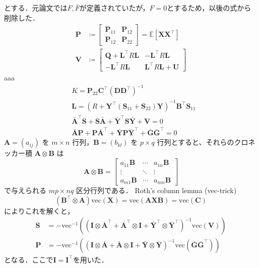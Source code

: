 とする．元論文では$F, \bar{F}$が定義されていたが，$F=0$とするため，以後の式から削除した．
\begin{align}
\mathbf{P} &\coloneqq\begin{bmatrix}
\mathbf{P}_{11} & \mathbf{P}_{12} \\
\mathbf{P}_{12} & \mathbf{P}_{22}
\end{bmatrix} = \mathbb{E}\left[\mathbf{X} \mathbf{X}^\top\right] \\
\mathbf{V} &\coloneqq\begin{bmatrix}
\mathbf{Q}+\mathbf{L}^\top R \mathbf{L} & -\mathbf{L}^\top R \mathbf{L} \\
-\mathbf{L}^\top R \mathbf{L} & \mathbf{L}^\top R \mathbf{L}+\mathbf{U}
\end{bmatrix}
\end{align}
aaa
\begin{align}
&K=\mathbf{P}_{22} \mathbf{C}^\top\left(\mathbf{D} \mathbf{D}^\top\right)^{-1} \\
&\mathbf{L}=\left(R+\mathbf{Y}^\top\left(\mathbf{S}_{11}+\mathbf{S}_{22}\right) \mathbf{Y}\right)^{-1} \mathbf{B}^\top \mathbf{S}_{11} \\
&\bar{\mathbf{A}}^\top \mathbf{S}+\mathbf{S} \bar{\mathbf{A}}+\bar{\mathbf{Y}}^\top \mathbf{S} \bar{\mathbf{Y}}+\mathbf{V}=0 \\
&\bar{\mathbf{A}} \mathbf{P}+\mathbf{P} \bar{\mathbf{A}}^\top+\bar{\mathbf{Y}} \mathbf{P} \bar{\mathbf{Y}}^\top+\bar{\mathbf{G}} \bar{\mathbf{G}}^\top=0
\end{align}
$\mathbf{A} = (a_{ij})$ を $m \times n$ 行列，$\mathbf{B} = (b_{kl})$ を $p \times q$ 行列とすると、それらのクロネッカー積 $\mathbf{A} \otimes \mathbf{B}$ は
\begin{equation}
\mathbf{A}\otimes \mathbf{B}={\begin{bmatrix}a_{11}\mathbf{B}&\cdots &a_{1n}\mathbf{B}\\\vdots &\ddots &\vdots \\a_{m1}\mathbf{B}&\cdots &a_{mn}\mathbf{B}\end{bmatrix}}
\end{equation}
で与えられる $mp \times nq$ 区分行列である．
Roth's column lemma (vec-trick) 
\begin{equation}
(\mathbf{B}^\top \otimes \mathbf{A})\text{vec}(\mathbf{X}) = \text{vec}(\mathbf{A}\mathbf{X}\mathbf{B})=\text{vec}(\mathbf{C})
\end{equation}
によりこれを解くと，
\begin{align}
\mathbf{S} &= -\text{vec}^{-1}\left(\left(\mathbf{I} \otimes \bar{\mathbf{A}}^\top + \bar{\mathbf{A}}^\top \otimes \mathbf{I} + \bar{\mathbf{Y}}^\top \otimes \bar{\mathbf{Y}}^\top\right)^{-1}\text{vec}(\mathbf{V})\right)\\
\mathbf{P} &= -\text{vec}^{-1}\left(\left(\mathbf{I} \otimes \bar{\mathbf{A}} + \bar{\mathbf{A}} \otimes \mathbf{I} + \bar{\mathbf{Y}} \otimes \bar{\mathbf{Y}}\right)^{-1}\text{vec}(\bar{\mathbf{G}}\bar{\mathbf{G}}^\top)\right)
\end{align}
となる．ここで$\mathbf{I}=\mathbf{I}^\top$を用いた．
